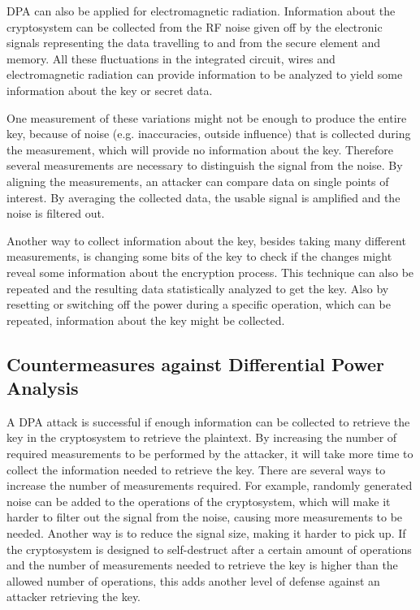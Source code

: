 DPA can also be applied for electromagnetic radiation. %
Information about the cryptosystem can be collected from the RF noise given off by the electronic signals representing the data travelling to and from the secure element and memory.
All these fluctuations in the integrated circuit, wires and electromagnetic radiation can provide information to be analyzed to yield some information about the key or secret data.

One measurement of these variations might not be enough to produce the entire key, because of noise (e.g. inaccuracies, outside influence) that is collected during the measurement, which will provide no information about the key.
Therefore several measurements are necessary to distinguish the signal from the noise.
By aligning the measurements, an attacker can compare data on single points of interest.
By averaging the collected data, the usable signal is amplified and the noise is filtered out.

Another way to collect information about the key, besides taking many different measurements, is changing some bits of the key to check if the changes might reveal some information about the encryption process.
This technique can also be repeated and the resulting data statistically analyzed to get the key.
Also by resetting or switching off the power during a specific operation, which can be repeated, information about the key might be collected. \cite{kocher2009differential}

\subsection{Countermeasures against Differential Power Analysis}
A DPA attack is successful if enough information can be collected to retrieve the key in the cryptosystem to retrieve the plaintext.
By increasing the number of required measurements to be performed by the attacker, it will take more time to collect the information needed to retrieve the key. 
There are several ways to increase the number of measurements required.
For example, randomly generated noise can be added to the operations of the cryptosystem, which will make it harder to filter out the signal from the noise, causing more measurements to be needed.
Another way is to reduce the signal size, making it harder to pick up. 
If the cryptosystem is designed to self-destruct after a certain amount of operations and the number of measurements needed to retrieve the key is higher than the allowed number of operations, this adds another level of defense against an attacker retrieving the key.

